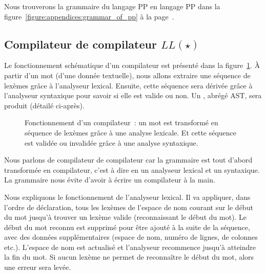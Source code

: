Nous trouverons la grammaire du langage PP en langage PP dans la
figure~\ref{figure:appendices:grammar_of_pp} à la
page~\pageref{figure:appendices:grammar_of_pp}.

\subsection{Compilateur de compilateur $LL(\star)$}
\label{subsection:data:compiler-compiler}

Le fonctionnement schématique d'un compilateur est présenté dans la
figure~\ref{figure:data:compiler}. À partir d'un {\strong mot} (d'une donnée
textuelle), nous allons extraire une {\strong séquence} de lexèmes grâce à
l'analyseur {\strong lexical}. Ensuite, cette séquence sera {\strong dérivée}
grâce à l'analyseur {\strong syntaxique} pour savoir si elle est valide ou non.
Un , abrégé AST, sera produit (détailé
ci-après).
%
\begin{figure}


\caption{\label{figure:data:compiler} Fonctionnement d'un compilateur~: un mot
est transformé en séquence de lexèmes grâce à une analyse lexicale. Et cette
séquence est validée ou invalidée grâce à une analyse syntaxique.}

\end{figure}

Nous parlons de {\strong compilateur de compilateur} car la grammaire est tout
d'abord transformée en compilateur, c'est à dire en un analyseur lexical et un
syntaxique. La grammaire nous évite d'avoir à écrire un compilateur à la main.

Nous expliquons le fonctionnement de l'analyseur lexical. Il va appliquer, dans
l'ordre de déclaration, tous les lexèmes de l'espace de nom courant sur le début
du mot jusqu'à trouver un lexème valide (reconnaissant le début du mot). Le
début du mot reconnu est supprimé pour être ajouté à la suite de la séquence,
avec des données supplémentaires (espace de nom, numéro de lignes, de colonnes
etc.). L'espace de nom est actualisé et l'analyseur recommence jusqu'à atteindre
la fin du mot. Si aucun lexème ne permet de reconnaître le début du mot, alors
une erreur sera levée.

